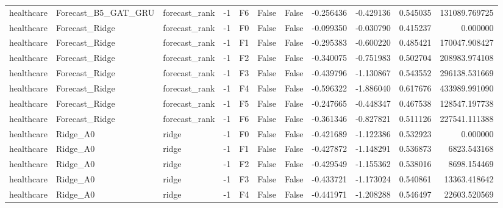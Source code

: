 \begin{tabular}{lllrlllrrrr}
healthcare &          Forecast\_B5\_GAT\_GRU & forecast\_rank &    -1 &  F6 &           False &            False & -0.256436 & -0.429136 & 0.545035 &    131089.769725 \\
healthcare &               Forecast\_Ridge & forecast\_rank &    -1 &  F0 &           False &            False & -0.099350 & -0.030790 & 0.415237 &         0.000000 \\
healthcare &               Forecast\_Ridge & forecast\_rank &    -1 &  F1 &           False &            False & -0.295383 & -0.600220 & 0.485421 &    170047.908427 \\
healthcare &               Forecast\_Ridge & forecast\_rank &    -1 &  F2 &           False &            False & -0.340075 & -0.751983 & 0.502704 &    208983.974108 \\
healthcare &               Forecast\_Ridge & forecast\_rank &    -1 &  F3 &           False &            False & -0.439796 & -1.130867 & 0.543552 &    296138.531669 \\
healthcare &               Forecast\_Ridge & forecast\_rank &    -1 &  F4 &           False &            False & -0.596322 & -1.886040 & 0.617676 &    433989.991090 \\
healthcare &               Forecast\_Ridge & forecast\_rank &    -1 &  F5 &           False &            False & -0.247665 & -0.448347 & 0.467538 &    128547.197738 \\
healthcare &               Forecast\_Ridge & forecast\_rank &    -1 &  F6 &           False &            False & -0.361346 & -0.827821 & 0.511126 &    227541.111388 \\
healthcare &                     Ridge\_A0 &         ridge &    -1 &  F0 &           False &            False & -0.421689 & -1.122386 & 0.532923 &         0.000000 \\
healthcare &                     Ridge\_A0 &         ridge &    -1 &  F1 &           False &            False & -0.427872 & -1.148291 & 0.536873 &      6823.543168 \\
healthcare &                     Ridge\_A0 &         ridge &    -1 &  F2 &           False &            False & -0.429549 & -1.155362 & 0.538016 &      8698.154469 \\
healthcare &                     Ridge\_A0 &         ridge &    -1 &  F3 &           False &            False & -0.433721 & -1.173024 & 0.540861 &     13363.418642 \\
healthcare &                     Ridge\_A0 &         ridge &    -1 &  F4 &           False &            False & -0.441971 & -1.208288 & 0.546497 &     22603.520569 \\

\end{tabular}
